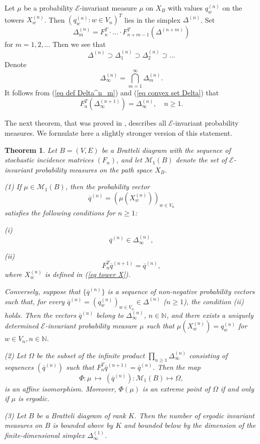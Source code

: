 \documentclass[11pt, english, reqno]{amsart}
\theoremstyle{definition}
\theoremstyle{remark}
\theoremstyle{plain}
\newtheorem{thm}[defin]{Theorem}
\def\ov{\overline}
\numberwithin{equation}{section}
\begin{document}
Let $\mu$ be  a probability $\mathcal E$-invariant measure $\mu$
on $X_B$ with values $q_w^{(n)}$ on the towers $X_w^{(n)}$.
Then $(q_w^{(n)} : w \in V_n)^T$ lies in  the simplex
 $\Delta^{(n)}$.
Set
\begin{equation}\label{eq def Delta^n_m}
\Delta_m^{(n)} = F_n^T \cdot \ldots \cdot
F_{n+m-1}^T(\Delta^{(n+m)})
\end{equation}
for $m = 1,2,\ldots$
Then we see that
$$
\Delta^{(n)} \supset \Delta^{(n)}_1 \supset \Delta^{(n)}_2 \supset \ldots
$$
Denote
\begin{equation}\label{eq convex set Delta}
\Delta_{\infty}^{(n)} = \bigcap_{m=1}^{\infty}\Delta_m^{(n)}.
\end{equation}
It follows from  (\ref{eq def Delta^n_m}) and  (\ref{eq convex set Delta})
 that
\begin{equation}\label{eq F_n relates Delta}
F_n^T(\Delta_{\infty}^{(n +1)}) = \Delta_{\infty}^{(n)}, \quad n \geq 1.
\end{equation}


The next theorem, that was proved in
\cite{BezuglyiKwiatkowskiMedynetsSolomyak2010}, describes
all $\mathcal E$-invariant probability measures. We formulate here a
slightly stronger version of this statement.

\begin{thm}
\label{BKMS_measures=invlimits}
 \label{Theorem_measures_general_case}  Let $B = (V,E)$ be a
 Bratteli diagram with the sequence of stochastic incidence matrices
 $(F_n)$, and let $\mathcal M_1(B)$ denote the set of
 $\mathcal E$-invariant probability measures on the path space
 $X_B$.

(1) If  $\mu \in \mathcal M_1(B)$, then the probability vector
$$
\ov q^{(n)}= (\mu(X_w^{(n)}))_{w\in V_n}
$$
satisfies the following conditions for $n\geq 1$:

(i) $$\ov q^{(n)} \in  \Delta_{\infty}^{(n)},$$

(ii) $$F^{T}_n\ov q^{(n+1)} = \ov q^{(n)},$$
where $X_w^{(n)}$ is defined in (\ref{eq tower X}).

Conversely, suppose that $\{\ov q^{(n)}\}$ is a sequence of
non-negative probability vectors such that, for every
 $\ov q^{(n)}= (q^{(n)}_w)_{w\in V_n} \in  \Delta^{(n)}$ ($n\geq 1$),
 the condition  (ii) holds. Then the vectors  $\ov q^{(n)}$ belong to
 $\Delta_{\infty}^{(n)}$, $n \in \mathbb N$, and   there  exists a uniquely
  determined $\mathcal E$-invariant  probability measure $\mu$ such that
   $\mu(X_w^{(n)})= q_w^{(n)}$   for $w\in V_n, n \in \mathbb N$.

(2) Let $\Omega$ be the subset of the infinite product
$\prod_{n\geq 1} \Delta^{(n)}_\infty$ consisting of sequences
$(\ov q^{(n)})$ such that $F^{T}_n\ov q^{(n+1)} = \ov q^{(n)}$. Then
 the map
$$
\Phi : \mu \ \mapsto \ (\ov q^{(n)}) : \mathcal M_1(B)  \mapsto
\Omega,
$$
is an affine isomorphism. Moreover, $\Phi(\mu)$ is an extreme point of
$\Omega$ if and only if $\mu$ is ergodic.

(3) Let $B$ be a Bratteli diagram of rank $K$. Then the number of ergodic invariant
 measures on $B$ is
 bounded  above by $K$ and bounded below by the dimension of  the finite-dimensional simplex
 $\Delta^{(1)}_\infty$.
\end{thm}
\end{document}
